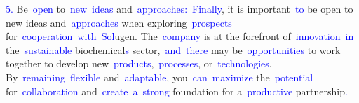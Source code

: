 \documentclass{article}
\begin{document}
\begin{tcolorbox}[colframe=black,colback=white]
{}\textcolor{blue}{5}\textcolor{blue}{.} Be\textcolor{blue}{~open} to\textcolor{blue}{~new}\textcolor{blue}{~ideas} and\textcolor{blue}{~approaches}\textcolor{blue}{:}\textcolor{blue}{~Finally}, it is important\textcolor{blue}{~to} be open to new ideas and\textcolor{blue}{~approaches} when exploring\textcolor{blue}{~prospects} for\textcolor{blue}{~cooperation}\textcolor{blue}{~with}\textcolor{blue}{~Sol}ugen. The\textcolor{blue}{~company} is at the forefront of\textcolor{blue}{~innovation}\textcolor{blue}{~in} the\textcolor{blue}{~sustainable} biochemical\textcolor{blue}{s} sector,\textcolor{blue}{~and}\textcolor{blue}{~there} may be\textcolor{blue}{~opportunities} to work together to develop new\textcolor{blue}{~products},\textcolor{blue}{~processes}, or\textcolor{blue}{~technologies}. By\textcolor{blue}{~remaining}\textcolor{blue}{~flexible} and\textcolor{blue}{~adaptable}, you\textcolor{blue}{~can}\textcolor{blue}{~maximize} the\textcolor{blue}{~potential} for\textcolor{blue}{~collaboration} and\textcolor{blue}{~create}\textcolor{blue}{~a}\textcolor{blue}{~strong} foundation for a\textcolor{blue}{~productive} partnership\textcolor{blue}{.}\textcolor{blue}{}
\end{tcolorbox}
\end{document}
